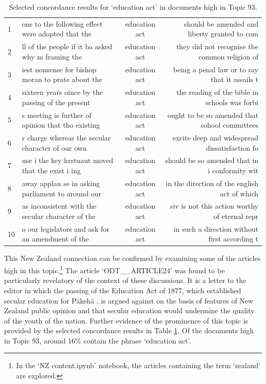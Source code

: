 \documentclass{article}
\begin{document}
\begin{table}[]
        \scriptsize
        \centering
        \begin{tabular}{l|lcr}
          1 & ons to the following effect were adopted that the  & education act &  should be amended and liberty granted to com \\
          2 & ll of the people if it ba asked why m framing the  & education act &  they did not recognise tbe common religion of \\
          3  & iest nonsense for bishop moran to prate about the  & education act &  being a penal law or to say that it assails t \\
          4  & sixteen years oince by the passing of the present  & education act &  the reading of the bible in schools was forbi \\
          5  & s meeting is further of opinion that tho existing &  education act &  ought to be so amended that sohool committees \\
          6  & r charge whereas the secular character of our own &  education act &  excite deep and widespread dissatisfaction fo \\
          7  & use i the key hrstuaut moved that the exist i ing  & education act &  should be so amended that in i conformity wit \\
          8  & away applau se in asking parliament to around our  & education act &  in the direction of the english act of which \\
          9  & as inconsistent with the secular character of the  & education act &  siv is not this action worthy of eternal repr \\
          10  & o our legislators and ask for an amendment of the  & education act &  in such a direction without first according t \\
      \end{tabular}
      \caption{Selected concordance results for `education act' in documents high in Topic 93.}
      \label{t:nz-concordance}
\end{table}


This New Zealand connection can be confirmed by examining some of the articles high in this topic.\footnote{In the `NZ content.ipynb' notebook, the articles containing the term `zealand' are explored.} The article `ODT\_\_\-ARTICLE24' was found to be particularly revelatory of the context of these discussions. It is a letter to the editor in which the passing of the Education Act of 1877, which established secular education for Pākehā \cite{education-act}, is argued against on the basis of features of New Zealand public opinion and that secular education would undermine the quality of the youth of the nation. Further evidence of the prominence of this topic is provided by the selected concordance results in Table \ref{t:nz-concordance}. Of the documents high in Topic 93, around 16\% contain the phrase `education act'.
\end{document}
